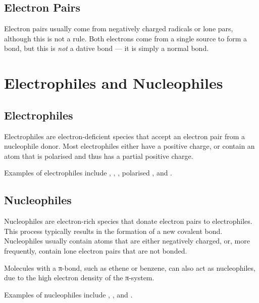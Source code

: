 

		\subsection{Electron Pairs}

			Electron pairs usually come from negatively charged radicals or lone pars, although this is not a rule.
			Both electrons come from a single source to form a bond, but this is \textit{not} a dative bond –– it is simply a normal
			bond.




	\pagebreak
	\section{Electrophiles and Nucleophiles}
		\subsection{Electrophiles}

			Electrophiles are electron-deficient species that accept an electron pair from a nucleophile donor. Most electrophiles
			either have a positive charge, or contain an atom that is polarised and thus has a partial positive charge.

			Examples of electrophiles include , , , polarised , and .


		\subsection{Nucleophiles}

			Nucleophiles are electron-rich species that donate electron pairs to electrophiles. This process typically results
			in the formation of a new covalent bond. Nucleophiles usually contain atoms that are either negatively charged, or,
			more frequently, contain lone electron pairs that are not bonded.

			Molecules with a π-bond, such as ethene or benzene, can also act as nucleophiles, due to the high electron
			density of the π-system.

			Examples of nucleophiles include , , and .


















